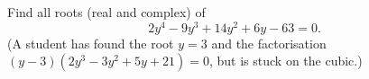 Find all roots (real and complex) of
\[
2y^4-9y^3+14y^2+6y-63=0 .
\]
(A student has found the root $y=3$ and the factorisation $(y-3)(2y^3-3y^2+5y+21)=0$, but is stuck on the cubic.)
